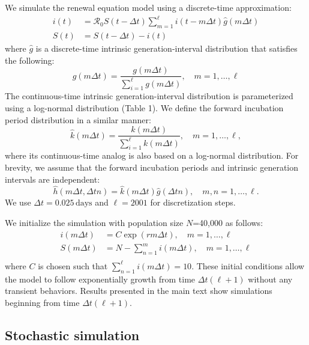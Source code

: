 \documentclass[12pt]{article}
\newcommand{\Rx}[1]{\ensuremath{{\mathcal R}_{#1}}\xspace}
\newcommand{\Ro}{\Rx{0}}
\begin{document}
We simulate the renewal equation model using a discrete-time approximation:
\begin{equation}
\begin{aligned}
i(t) &= \Ro S(t-\Delta t) \sum_{m=1}^{\ell} i(t-m \Delta t) \hat{g}(m \Delta t) \\
S(t) &= S(t-\Delta t) - i(t)
\end{aligned}
\end{equation}
where $\hat{g}$ is a discrete-time intrinsic generation-interval distribution that satisfies the following:
\begin{equation}
\hat{g}(m \Delta t) = \frac{g(m \Delta t)}{\sum_{i=1}^\ell g(m \Delta t)}, \quad m=1, \dots, \ell
\end{equation}
The continuous-time intrinsic generation-interval distribution is parameterized using a log-normal distribution (Table 1). We define the forward incubation period distribution in a similar manner:
\begin{equation}
\hat{k}(m \Delta t) = \frac{k(m \Delta t)}{\sum_{i=1}^\ell k(m \Delta t)}, \quad m=1, \dots, \ell,
\end{equation}
where its continuous-time analog is also based on a log-normal distribution.
For brevity, we assume that the forward incubation periods and intrinsic generation intervals are independent:
\begin{equation}
\hat{h}(m \Delta t, \Delta t n) = \hat{k}(m \Delta t)\hat{g}(\Delta t n), \quad m,n=1, \dots, \ell.
\end{equation}
We use $\Delta t = 0.025\,\textrm{days}$ and $\ell=2001$ for discretization steps.

We initialize the simulation with population size $N$=40,000 as follows:
\begin{equation}
\begin{aligned}
i(m \Delta t) &= C \exp(r m \Delta t), \quad m=1, \dots, \ell\\
S(m \Delta t) &= N - \sum_{n=1}^m i(m \Delta t), \quad m=1, \dots, \ell\\
\end{aligned}
\end{equation}
where $C$ is chosen such that $\sum_{n=1}^\ell i(m \Delta t)=10$.
These initial conditions allow the model to follow exponentially growth from time $\Delta t (\ell + 1)$ without any transient behaviors.
Results presented in the main text show simulations beginning from time $\Delta t (\ell + 1)$.

\subsection{Stochastic simulation}
\end{document}
